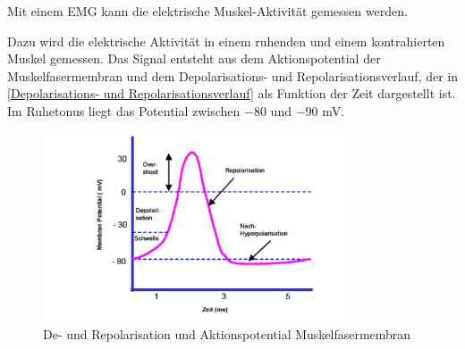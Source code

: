 Mit einem EMG kann die elektrische Muskel-Aktivität gemessen werden.

Dazu wird die elektrische Aktivität in einem ruhenden und einem kontrahierten Muskel gemessen. Das Signal entsteht aus dem Aktionspotential der Muskelfasermembran und dem Depolarisations- und Repolarisationsverlauf, der in \autoref{Depolarisations- und Repolarisationsverlauf} als Funktion der Zeit dargestellt ist. Im Ruhetonus liegt das Potential zwischen $-80$ und  $-90$ mV.
\begin{figure}[h!]
      \centering
      \includegraphics[width=0.8\textwidth]{img/De- Repolarisation.PNG}
      \caption{De- und Repolarisation und Aktionspotential Muskelfasermembran \cite{Vorlesung-Muskulatur-EMG}}
      \label{fig:depolarisations-und-repolarisationsverlauf}
\end{figure}

